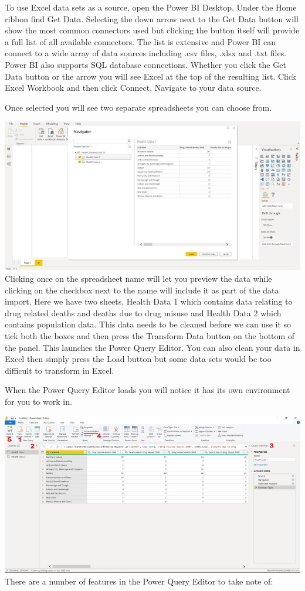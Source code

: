 \documentclass[
]{book}
\begin{document}
To use Excel data sets as a source, open the Power BI Desktop. Under the Home ribbon find Get Data. Selecting the down arrow next to the Get Data button will show the most common connectors used but clicking the button itself will provide a full list of all available connectors. The list is extensive and Power BI can connect to a wide array of data sources including .csv files, .xlsx and .txt files. Power BI also supports SQL database connections. Whether you click the Get Data button or the arrow you will see Excel at the top of the resulting list. Click Excel Workbook and then click Connect. Navigate to your data source.

Once selected you will see two separate spreadsheets you can choose from.

\includegraphics{bi2.jpg}
Clicking once on the spreadsheet name will let you preview the data while clicking on the checkbox next to the name will include it as part of the data import. Here we have two sheets, Health Data 1 which contains data relating to drug related deaths and deaths due to drug misuse and Health Data 2 which contains population data. This data needs to be cleaned before we can use it so tick both the boxes and then press the Transform Data button on the bottom of the panel. This launches the Power Query Editor. You can also clean your data in Excel then simply press the Load button but some data sets would be too difficult to transform in Excel.

When the Power Query Editor loads you will notice it has its own environment for you to work in.

\includegraphics{bi3.jpg}
There are a number of features in the Power Query Editor to take note of:
\end{document}
